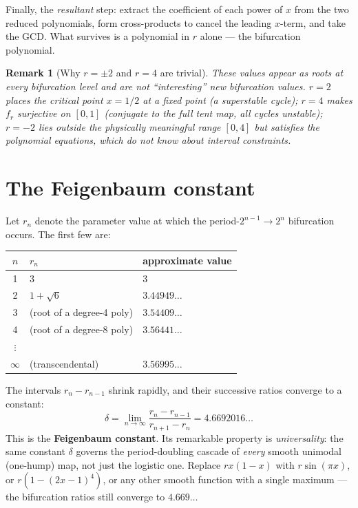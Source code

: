 \documentclass[11pt]{article}
\newtheorem{remark}{Remark}
\begin{document}
Finally, the \emph{resultant} step: extract the coefficient of each power of
$x$ from the two reduced polynomials, form cross-products to cancel the leading
$x$-term, and take the GCD.  What survives is a polynomial in $r$ alone --- the
bifurcation polynomial.

\begin{remark}[Why $r=\pm2$ and $r=4$ are trivial]
These values appear as roots at every bifurcation level and are not
``interesting'' new bifurcation values.  $r=2$ places the critical point $x=1/2$
at a fixed point (a superstable cycle); $r=4$ makes $f_r$ surjective on $[0,1]$
(conjugate to the full tent map, all cycles unstable); $r=-2$ lies outside the
physically meaningful range $[0,4]$ but satisfies the polynomial equations,
which do not know about interval constraints.
\end{remark}

\section{The Feigenbaum constant}
\label{sec:feigenbaum}

Let $r_n$ denote the parameter value at which the period-$2^{n-1}\to 2^n$
bifurcation occurs.  The first few are:
\begin{center}
\renewcommand{\arraystretch}{1.25}
\begin{tabular}{cll}
$n$ & $r_n$ & approximate value \\\hline
1 & $3$ & $3$ \\
2 & $1+\sqrt{6}$ & $3.44949\ldots$ \\
3 & (root of a degree-4 poly) & $3.54409\ldots$ \\
4 & (root of a degree-8 poly) & $3.56441\ldots$ \\
$\vdots$ & & \\
$\infty$ & (transcendental) & $3.56995\ldots$
\end{tabular}
\end{center}
The intervals $r_n-r_{n-1}$ shrink rapidly, and their successive ratios converge
to a constant:
\begin{equation}
\label{eq:feigenbaum}
\delta = \lim_{n\to\infty}\frac{r_n-r_{n-1}}{r_{n+1}-r_n} = 4.6692016\ldots
\end{equation}
This is the \textbf{Feigenbaum constant}.  Its remarkable property is
\emph{universality}: the same constant $\delta$ governs the period-doubling
cascade of \emph{every} smooth unimodal (one-hump) map, not just the logistic
one.  Replace $rx(1-x)$ with $r\sin(\pi x)$, or $r(1-(2x-1)^4)$, or any other
smooth function with a single maximum --- the bifurcation ratios still converge
to $4.669\ldots$
\end{document}
